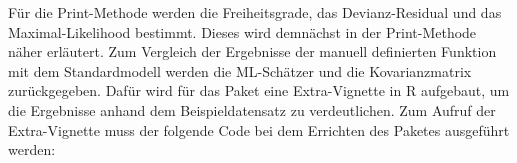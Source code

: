 \documentclass[12pt,]{article}
\newenvironment{Shaded}{\begin{snugshade}}{\end{snugshade}}
\newcommand{\KeywordTok}[1]{\textcolor[rgb]{0.13,0.29,0.53}{\textbf{#1}}}
\newcommand{\DecValTok}[1]{\textcolor[rgb]{0.00,0.00,0.81}{#1}}
\newcommand{\StringTok}[1]{\textcolor[rgb]{0.31,0.60,0.02}{#1}}
\newcommand{\CommentTok}[1]{\textcolor[rgb]{0.56,0.35,0.01}{\textit{#1}}}
\newcommand{\OperatorTok}[1]{\textcolor[rgb]{0.81,0.36,0.00}{\textbf{#1}}}
\newcommand{\NormalTok}[1]{#1}
\begin{document}
\begin{Shaded}
\end{Shaded}

Für die Print-Methode werden die Freiheitsgrade, das Devianz-Residual
und das Maximal-Likelihood bestimmt. Dieses wird demnächst in der
Print-Methode näher erläutert. Zum Vergleich der Ergebnisse der manuell
definierten Funktion mit dem Standardmodell werden die ML-Schätzer und
die Kovarianzmatrix zurückgegeben. Dafür wird für das Paket eine
Extra-Vignette in R aufgebaut, um die Ergebnisse anhand dem
Beispieldatensatz zu verdeutlichen. Zum Aufruf der Extra-Vignette muss
der folgende Code bei dem Errichten des Paketes ausgeführt werden:
\end{document}
